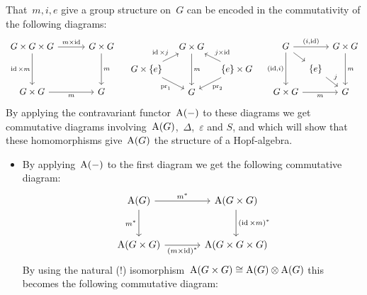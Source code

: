 \begin{fluff}
  That~$m, i, e$ give a group structure on~$G$ can be encoded in the commutativity of the following diagrams:
  \[
    \begin{tikzcd}[column sep = 30pt, row sep = 35pt]
        G \times G \times G
        \arrow{r}[above]{m \times \id}
        \arrow{d}[left]{\id \times m}
      & G \times G
        \arrow{d}[right]{m}
      \\
        G \times G
        \arrow{r}[below]{m}
      & G
    \end{tikzcd}
    \quad
    \begin{tikzcd}[column sep = 10pt, row sep = 9pt]
        {}
      & G \times G
        \arrow{dd}[right]{m}
      & {}
      \\
        G \times \{e\}
        \arrow{ur}[above left]{\id \times j}
        \arrow{dr}[below left]{\pr_1}
      & {}
      & \{e\} \times G
        \arrow{ul}[above right]{j \times \id}
        \arrow{dl}[below right]{\pr_2}
      \\
        {}
      & G
      & {}
    \end{tikzcd}
    \quad
    \begin{tikzcd}[column sep = 3pt, row sep = 9pt]
        G
        \arrow{rr}[above]{(i,\id)}
        \arrow{dd}[left]{(\id,i)}
        \arrow{dr}
      & {}
      & G \times G
        \arrow{dd}[right]{m}
      \\
        {}
      & \{e\}
        \arrow{dr}{j}
      & {}
      \\
        G \times G
        \arrow{rr}[below]{m}
      & {}
      & G
    \end{tikzcd}
  \]
  By applying the contravariant functor~$\operatorname{A}(-)$ to these diagrams we get commutative diagrams involving~$\operatorname{A}(G)$,~$\Delta$,~$\varepsilon$ and $S$, and which will show that these homomorphisms give~$\operatorname{A}(G)$ the structure of a Hopf-algebra.
  \begin{itemize}
    \item
      By applying~$\operatorname{A}(-)$ to the first diagram we get the following commutative diagram:
      \[
        \begin{tikzcd}[sep = large]
            \coord(G)
            \arrow{r}[above]{m^*}
            \arrow{d}[left]{m^*}
          & \coord(G \times G)
            \arrow{d}[right]{(\id \times m)^*}
          \\
            \coord(G \times G)
            \arrow{r}[below]{(m \times \id)^*}
          & \coord(G \times G \times G)
        \end{tikzcd}
      \]
      By using the natural (!) isomorphism~$\operatorname{A}(G \times G) \cong \operatorname{A}(G) \mathbin{\otimes} \operatorname{A}(G)$ this becomes the following commutative diagram:

\end{itemize}
\end{fluff}
